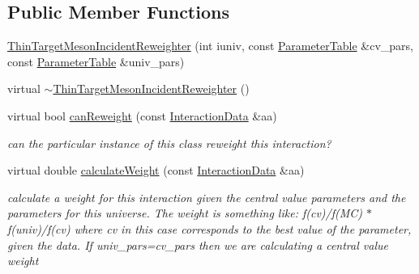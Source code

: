 \subsection*{Public Member Functions}
\begin{DoxyCompactItemize}
\item 
\hyperlink{class_neutrino_flux_reweight_1_1_thin_target_meson_incident_reweighter_a4f5d062846bbacf572bba8d4efba0082}{Thin\-Target\-Meson\-Incident\-Reweighter} (int iuniv, const \hyperlink{class_neutrino_flux_reweight_1_1_parameter_table}{Parameter\-Table} \&cv\-\_\-pars, const \hyperlink{class_neutrino_flux_reweight_1_1_parameter_table}{Parameter\-Table} \&univ\-\_\-pars)
\item 
virtual \hyperlink{class_neutrino_flux_reweight_1_1_thin_target_meson_incident_reweighter_a3055acaa26cbb3ca0016563410d5a58f}{$\sim$\-Thin\-Target\-Meson\-Incident\-Reweighter} ()
\item 
virtual bool \hyperlink{class_neutrino_flux_reweight_1_1_thin_target_meson_incident_reweighter_ad6974a8bf1b26e86252ee2bc1e112c5a}{can\-Reweight} (const \hyperlink{class_neutrino_flux_reweight_1_1_interaction_data}{Interaction\-Data} \&aa)
\begin{DoxyCompactList}\small\item\em can the particular instance of this class reweight this interaction? \end{DoxyCompactList}\item 
virtual double \hyperlink{class_neutrino_flux_reweight_1_1_thin_target_meson_incident_reweighter_adfb3f3e69286e74c6a9c681a0593b4d5}{calculate\-Weight} (const \hyperlink{class_neutrino_flux_reweight_1_1_interaction_data}{Interaction\-Data} \&aa)
\begin{DoxyCompactList}\small\item\em calculate a weight for this interaction given the central value parameters and the parameters for this universe. The weight is something like\-: f(cv)/f(M\-C) $\ast$ f(univ)/f(cv) where cv in this case corresponds to the best value of the parameter, given the data. If univ\-\_\-pars=cv\-\_\-pars then we are calculating a central value weight \end{DoxyCompactList}\end{DoxyCompactItemize}
